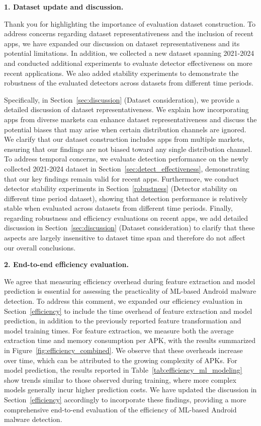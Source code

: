 \noindent \textbf{1. Dataset update and discussion.}

Thank you for highlighting the importance of evaluation dataset construction. To address concerns regarding dataset representativeness and the inclusion of recent apps, we have expanded our discussion on dataset representativeness and its potential limitations. In addition, we collected a new dataset spanning 2021-2024 and conducted additional experiments to evaluate detector effectiveness on more recent applications. We also added stability experiments to demonstrate the robustness of the evaluated detectors across datasets from different time periods.

Specifically, in Section~\ref{sec:discussion} (Dataset consideration), we provide a detailed discussion of dataset representativeness.
We explain how incorporating apps from diverse markets can enhance dataset representativeness and discuss the potential biases that may arise when certain distribution channels are ignored. We clarify that our dataset construction includes apps from multiple markets, ensuring that our findings are not biased toward any single distribution channel.
To address temporal concerns, we evaluate detection performance on the newly collected 2021-2024 dataset in Section~\ref{sec:detect_effectiveness}, demonstrating that our key findings remain valid for recent apps. Furthermore, we conduct detector stability experiments in Section~\ref{robustness} (Detector stability on different time period dataset), showing that detection performance is relatively stable when evaluated across datasets from different time periods. 
Finally, regarding robustness and efficiency evaluations on recent apps, we add detailed discussion in Section~\ref{sec:discussion} (Dataset consideration) to clarify that these aspects are largely insensitive to dataset time span and therefore do not affect our overall conclusions.

\vspace{0.1cm}
\noindent \textbf{2. End-to-end efficiency evaluation.}

We agree that measuring efficiency overhead during feature extraction and model prediction is essential for assessing the practicality of ML-based Android malware detection. To address this comment, we expanded our efficiency evaluation in Section~\ref{efficiency} to include the time overhead of feature extraction and model prediction, in addition to the previously reported feature transformation and model training times.
For feature extraction, we measure both the average extraction time and memory consumption per APK, with the results summarized in Figure~\ref{fig:efficiency_combined}. We observe that these overheads increase over time, which can be attributed to the growing complexity of APKs. For model prediction, the results reported in Table~\ref{tab:efficiency_ml_modeling} show trends similar to those observed during training, where more complex models generally incur higher prediction costs.
We have updated the discussion in Section~\ref{efficiency} accordingly to incorporate these findings, providing a more comprehensive end-to-end evaluation of the efficiency of ML-based Android malware detection.

